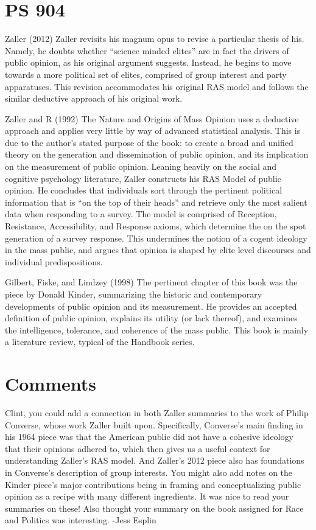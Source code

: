 \documentclass[
  english,
  man]{apa6}
\begin{document}
\hypertarget{ps-904}{%
\section{PS 904}\label{ps-904}}

Zaller (2012)
Zaller revisits his magnum opus to revise a particular thesis of his. Namely,
he doubts whether \enquote{science minded elites} are in fact the drivers of public
opinion, as his original argument suggests. Instead, he begins to move
towards a more political set of elites, comprised of group interest and party
apparatuses. This revision accommodates his original RAS model and follows the
similar deductive approach of his original work.

Zaller and R (1992)
The Nature and Origins of Mass Opinion uses a deductive approach and applies
very little by way of advanced statistical analysis. This is due to the author's
stated purpose of the book: to create a broad and unified theory on the
generation and dissemination of public opinion, and its implication on the
measurement of public opinion. Leaning heavily on the social and cognitive
psychology literature, Zaller constructs his RAS Model of public opinion.
He concludes that individuals sort through the pertinent political information
that is \enquote{on the top of their heads} and retrieve only the most salient data
when responding to a survey. The model is comprised of Reception, Resistance,
Accessibility, and Response axioms, which determine the on the spot generation
of a survey response. This undermines the notion of a cogent ideology in the
mass public, and argues that opinion is shaped by elite level discourses and
individual predispositions.

Gilbert, Fiske, and Lindzey (1998)
The pertinent chapter of this book was the piece by Donald Kinder, summarizing
the historic and contemporary developments of public opinion and its
measurement. He provides an accepted definition of public opinion, explains
its utility (or lack thereof), and examines the intelligence, tolerance, and
coherence of the mass public. This book is mainly a literature review, typical
of the Handbook series.

\hypertarget{comments}{%
\section{Comments}\label{comments}}

Clint, you could add a connection in both Zaller summaries to the work of Philip Converse, whose work Zaller built upon. Specifically, Converse's main finding in his 1964 piece was that the American public did not have a cohesive ideology that their opinions adhered to, which then gives us a useful context for understanding Zaller's RAS model. And Zaller's 2012 piece also has foundations in Converse's description of group interests. You might also add notes on the Kinder piece's major contributions being in framing and conceptualizing public opinion as a recipe with many different ingredients.
It was nice to read your summaries on these! Also thought your summary on the book assigned for Race and Politics was interesting.
-Jess Esplin
\end{document}
